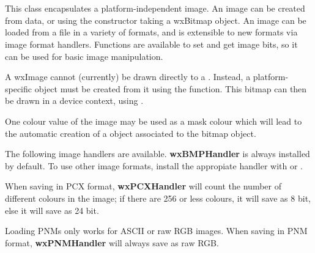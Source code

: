 \section{}\label{wximage}

This class encapsulates a platform-independent image. An image can be created
from data, or using the constructor taking a wxBitmap object. An image
can be loaded from a file in a variety of formats, and is extensible to new formats
via image format handlers. Functions are available to set and get image bits, so
it can be used for basic image manipulation.

A wxImage cannot (currently) be drawn directly to a . Instead, 
a platform-specific  object must be created from it using
the  function. This bitmap can then
be drawn in a device context, using .

One colour value of the image may be used as a mask colour which will lead to the automatic
creation of a  object associated to the bitmap object.


The following image handlers are available. {\bf wxBMPHandler} is always
installed by default. To use other image formats, install the appropiate
handler with  or 
.

\twocolwidtha{5cm}%
\begin{twocollist}
\end{twocollist}

When saving in PCX format, {\bf wxPCXHandler} will count the number of
different colours in the image; if there are 256 or less colours, it will
save as 8 bit, else it will save as 24 bit.

Loading PNMs only works for ASCII or raw RGB images. When saving in
PNM format, {\bf wxPNMHandler} will always save as raw RGB.

